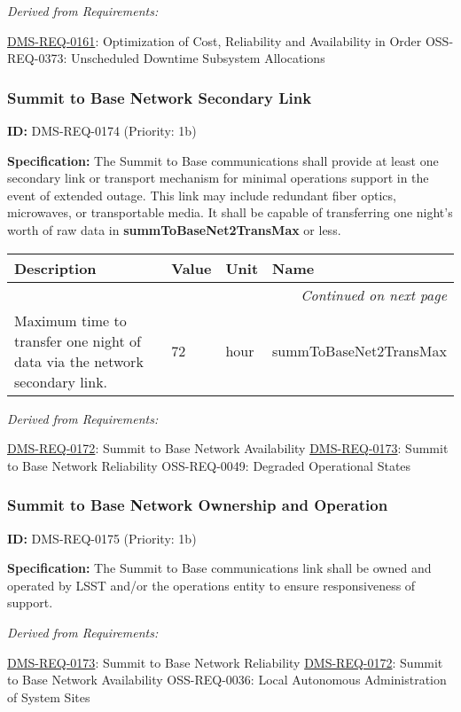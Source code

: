 \documentclass[SE,toc,lsstdraft]{lsstdoc}
\makeatletter
\newcommand{\paramname}[1]{\hspace{0pt}#1}
\newcommand{\unitname}[1]{\hspace{0pt}#1}
\newenvironment{parameters}[0]{%
\setlength\LTleft{0pt}
\setlength\LTright{\fill}
\begin{small}
\begin{longtable}[]{|p{0.49\textwidth}|l|p{0.6in}|p{1.70in}@{}|}

\hline \textbf{Description} & \textbf{Value} & \textbf{Unit} & \textbf{Name} \\ \hline
\endhead

\hline \multicolumn{4}{r}{\emph{Continued on next page}} \\
\endfoot

\hline\hline
\endlastfoot
}{%
\hline
\end{longtable}
\end{small}
}
\makeatother
\begin{document}
\emph{Derived from Requirements:}

\hyperref[DMS-REQ-0161]{DMS-REQ-0161}:
Optimization of Cost, Reliability and Availability in Order \newline
OSS-REQ-0373:
Unscheduled Downtime Subsystem Allocations \newline

\subsubsection{Summit to Base Network Secondary Link}

\label{DMS-REQ-0174}
\textbf{ID:} DMS-REQ-0174 (Priority: 1b)

\textbf{Specification:} The Summit to Base communications shall provide at least one secondary link or transport mechanism for minimal operations support in the event of extended outage.  This link may include redundant fiber optics, microwaves, or transportable media.  It shall be capable of transferring one night's worth of raw data in \textbf{summToBaseNet2TransMax }or less.

\begin{parameters}
Maximum time to transfer one night of data via the network secondary link.
&
72
&
\unitname{%
hour
}
&
\paramname{%
summToBaseNet2TransMax
} \\\hline
\end{parameters}

\emph{Derived from Requirements:}

\hyperref[DMS-REQ-0172]{DMS-REQ-0172}:
Summit to Base Network Availability \newline
\hyperref[DMS-REQ-0173]{DMS-REQ-0173}:
Summit to Base Network Reliability \newline
OSS-REQ-0049:
Degraded Operational States \newline

\subsubsection{Summit to Base Network Ownership and Operation}

\label{DMS-REQ-0175}
\textbf{ID:} DMS-REQ-0175 (Priority: 1b)

\textbf{Specification:} The Summit to Base communications link shall be owned and operated by LSST and/or the operations entity to ensure responsiveness of support.

\emph{Derived from Requirements:}

\hyperref[DMS-REQ-0173]{DMS-REQ-0173}:
Summit to Base Network Reliability \newline
\hyperref[DMS-REQ-0172]{DMS-REQ-0172}:
Summit to Base Network Availability \newline
OSS-REQ-0036:
Local Autonomous Administration of System Sites \newline
\end{document}
